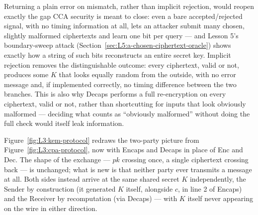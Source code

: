 Returning a plain error on mismatch, rather than implicit rejection, would reopen exactly the gap CCA security is meant to close: even a bare accepted/rejected signal, with no timing information at all, lets an attacker submit many chosen, slightly malformed ciphertexts and learn one bit per query --- and Lesson 5's boundary-sweep attack (Section~\ref{sec:L5:a-chosen-ciphertext-oracle}) shows exactly how a string of such bits reconstructs an entire secret key. Implicit rejection removes the distinguishable outcome: every ciphertext, valid or not, produces some $K$ that looks equally random from the outside, with no error message and, if implemented correctly, no timing difference between the two branches. This is also why Decaps performs a full re-encryption on every ciphertext, valid or not, rather than shortcutting for inputs that look obviously malformed --- deciding what counts as ``obviously malformed'' without doing the full check would itself leak information.

Figure~\ref{fig:L3:kem-protocol} redraws the two-party picture from Figure~\ref{fig:L3:cpa-protocol}, now with Encaps and Decaps in place of Enc and Dec. The shape of the exchange --- $pk$ crossing once, a single ciphertext crossing back --- is unchanged; what is new is that neither party ever transmits a message at all. Both sides instead arrive at the same shared secret $K$ independently, the Sender by construction (it generated $K$ itself, alongside $c$, in line 2 of Encaps) and the Receiver by recomputation (via Decaps) --- with $K$ itself never appearing on the wire in either direction.

